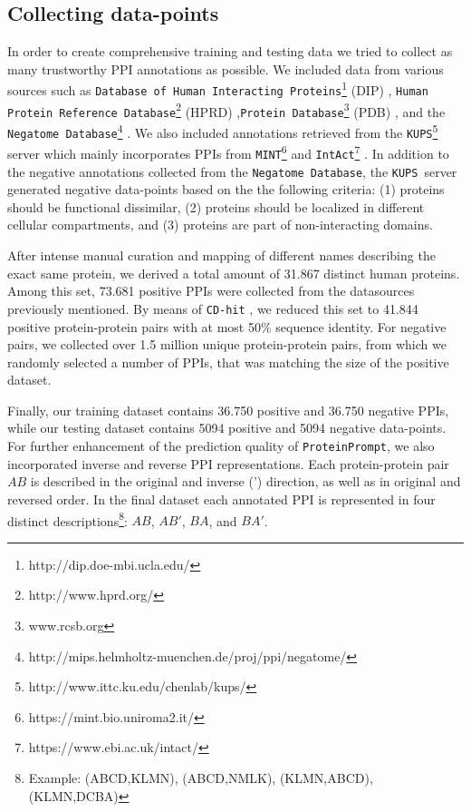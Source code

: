 \documentclass[preprint,3p,times,twocolumn]{elsarticle}
\newcommand{\nega}{\texttt{Negatome Database}}
\newcommand{\kups}{\texttt{KUPS}}
\newcommand{\tool}{\texttt{ProteinPrompt}\hspace{2pt}}
\begin{document}
\subsection{Collecting data-points}
In order to create comprehensive training and testing data we tried to
collect as many trustworthy PPI annotations as possible. We included
data from various sources such as \texttt{Database of Human
  Interacting Proteins}\footnote{http://dip.doe-mbi.ucla.edu/} (DIP)
\cite{Salwinski:2004}, \texttt{Human Protein Reference
  Database}\footnote{http://www.hprd.org/} (HPRD)
\cite{Keshava_Prasad:2009},\texttt{Protein
  Database}\footnote{www.rcsb.org} (PDB) \cite{Berman:2000}, and the
\nega\footnote{http://mips.helmholtz-muenchen.de/proj/ppi/negatome/}
\cite{Blohm:2014}. We also included annotations retrieved from the
\kups \footnote{http://www.ittc.ku.edu/chenlab/kups/}   server
\cite{Chen:2011} which mainly incorporates PPIs from
\texttt{MINT}\footnote{https://mint.bio.uniroma2.it/}
\cite{Licata:2012} and
\texttt{IntAct}\footnote{https://www.ebi.ac.uk/intact/}
\cite{Orchard:2014}. In addition to the negative annotations collected
from the \nega, the \kups\ server generated negative data-points based
on the the following criteria: (1) proteins should be functional
dissimilar, (2) proteins should be localized in different cellular
compartments, and (3) proteins are part of non-interacting domains. 

After intense manual curation and mapping of different names describing
the exact same protein, we derived a total amount of 31.867 distinct
human proteins. Among this set, 73.681 positive PPIs were collected
from the datasources previously mentioned. By means of \texttt{CD-hit}
\cite{Li:2006, Fu:2012}, we reduced this set to 41.844 positive
protein-protein pairs with at most 50\% sequence identity. For
negative pairs, we collected over 1.5 million unique protein-protein
pairs, from which we randomly selected a number of PPIs, that was
matching the size of the positive dataset.

Finally, our training dataset contains 36.750 positive and 36.750
negative PPIs, while our testing dataset contains 5094 positive and
5094 negative data-points. For further enhancement of the prediction
quality of \tool, we also incorporated inverse and reverse PPI
representations. Each protein-protein pair $AB$ is described in the
original and inverse (') direction, as well as in original and
reversed order. In the final dataset each annotated PPI is represented
in four distinct descriptions\footnote{Example: (ABCD,KLMN),
  (ABCD,NMLK), (KLMN,ABCD), (KLMN,DCBA)}: $AB$, $AB'$, $BA$, and
$BA'$. 
\end{document}
